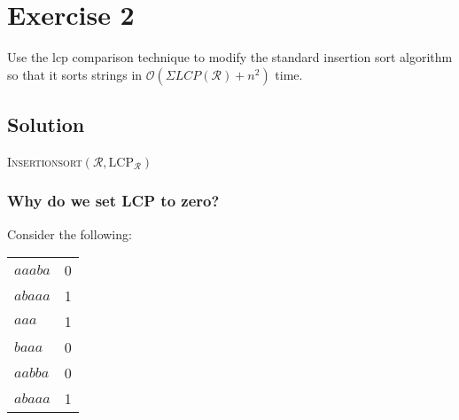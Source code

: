\documentclass[10pt]{article}
\begin{document}
\section*{Exercise 2}
\color{blue}
Use the lcp comparison technique to modify the standard insertion sort algorithm so that it sorts strings in $\mathcal{O}(\Sigma LCP(\mathcal{R}) + n^2)$ time.
\color{black}

\subsection*{Solution}
\begin{algorithm}
\caption{\textsc{Insertionsort}$(\mathcal{R}, \text{LCP}_{\mathcal{R}})$}
\end{algorithm}
\subsubsection*{Why do we set LCP to zero?}
Consider the following:
\begin{center}
\begin{tabular}{|l|l|}
\hline
$aaaba$ & 0 \\
$abaaa$ & 1 \\
$aaa$     & 1 \\
$baaa$   & 0 \\
$aabba$ & 0 \\
$abaaa$ & 1 \\
\hline

\hline
\end{tabular}
\end{center}
\end{document}
